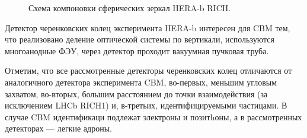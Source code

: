 \begin{figure}[H]
\begin{minipage}[b]{0.545\textwidth}
\caption{Схема компоновки сферических зеркал HERA-b RICH.}
\label{fig:HERAbRICHmirrors}
\end{minipage}
\end{figure}

Детектор черенковских колец эксперимента HERA-b интересен для CBM тем, что реализовано деление оптической системы по вертикали, используются многоанодные ФЭУ, через детектор проходит вакуумная пучковая труба.

Отметим, что все рассмотренные детекторы черенковских колец отличаются от аналогичного детектора эксперимента CBM, во-первых, меньшим угловым захватом, во-вторых, большим расстоянием до точки взаимодействия (за исключением LHCb RICH1) и, в-третьих, идентифицируемыми частицами. В случае CBM идентификаци подлежат электроны и позитhоны, а  в рассмотренных детекторах --- легкие адроны.